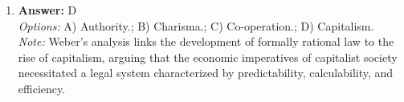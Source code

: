 \documentclass[12pt]{article}
\begin{document}
\begin{enumerate}[label=\arabic*.]
\\ \textit{Note:} Dworkin's endorsement of Hume's principle emphasizes the distinction between descriptive facts and prescriptive norms, arguing that moral and ethical judgments cannot be solely derived from empirical observations of the world or human nature.
\item \textbf{Answer:} D
\\ \textit{Options:} A) Authority.; B) Charisma.; C) Co-operation.; D) Capitalism.
\\ \textit{Note:} Weber's analysis links the development of formally rational law to the rise of capitalism, arguing that the economic imperatives of capitalist society necessitated a legal system characterized by predictability, calculability, and efficiency.
\end{enumerate}
\end{document}
